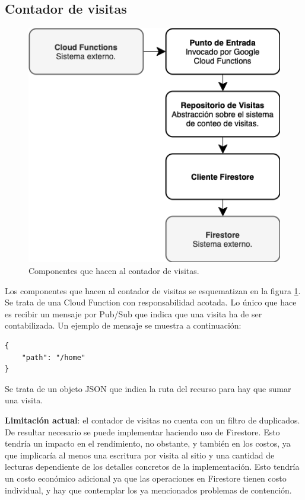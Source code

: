 \documentclass[11pt]{scrartcl}
\begin{document}
\newpage
\subsection{Contador de visitas}

\begin{figure}
\begin{center}
\includegraphics[scale=0.7]{img/visitcount}
\end{center}
\caption{Componentes que hacen al contador de visitas.}
\label{fig:visitcount}
\end{figure}

Los componentes que hacen al contador de visitas se esquematizan en la figura \ref{fig:visitcount}. Se trata de una Cloud Function con responsabilidad acotada. Lo único que hace es recibir un mensaje por Pub/Sub que indica que una visita ha de ser contabilizada. Un ejemplo de mensaje se muestra a continuación:
 \begin{verbatim}
{
	"path": "/home"
}
\end{verbatim}

Se trata de un objeto JSON que indica la ruta del recurso para hay que sumar una visita.

\textbf{Limitación actual}: el contador de visitas no cuenta con un filtro de duplicados. De resultar necesario se puede implementar haciendo uso de Firestore. Esto tendría un impacto en el rendimiento, no obstante, y también en los costos, ya que implicaría al menos una escritura por visita al sitio y una cantidad de lecturas dependiente de los detalles concretos de la implementación. Esto tendría un costo económico adicional ya que las operaciones en Firestore tienen costo individual, y hay que contemplar los ya mencionados problemas de contención.
\end{document}
